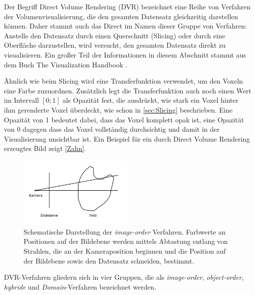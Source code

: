 \documentclass[a4paper,fontsize=12pt,toc=bib,parskip=half,ngerman]{scrartcl}
\begin{document}
Der Begriff \glq Direct Volume Rendering\grq{} (DVR) bezeichnet eine Reihe von Verfahren der Volumenvisualisierung, die den gesamten Datensatz gleichzeitig darstellen k\"onnen. Daher stammt auch das \glq Direct\grq{} im Namen dieser Gruppe von Verfahren: Anstelle den Datensatz durch einen Querschnitt (Slicing) oder durch eine Oberfl\"ache darzustellen, wird versucht, den gesamten Datensatz direkt zu visualisieren. Ein gro{\ss}er Teil der Informationen in diesem Abschnitt stammt aus dem Buch \glqq The Visualization Handbook\grqq{} \cite{hansen2005visualization}.

\"Ahnlich wie beim Slicing wird eine Transferfunktion verwendet, um den Voxeln eine Farbe zuzuordnen. Zus\"atzlich legt die Transferfunktion auch noch einen Wert im Intervall $[0;1]$ als Opazit\"at fest, die ausdr\"uckt, wie stark ein Voxel hinter ihm gerenderte Voxel \"uberdeckt, wie schon in \cref{sec:Slicing} beschrieben. Eine Opazit\"at von 1 bedeutet dabei, dass das Voxel komplett opak ist, eine Opazit\"at von 0 dagegen dass das Voxel vollst\"andig durchsichtig und damit in der Visualisierung unsichtbar ist. Ein Beispiel f\"ur ein durch Direct Volume Rendering erzeugtes Bild zeigt \cref{Zahn}. 

\begin{figure}
	\centering
	\includegraphics[width=0.5\textwidth]{pictures/DVR}
	\caption{Schematische Darstellung der \textit{image-order} Verfahren. Farbwerte an Positionen auf der Bildebene werden mittels Abtastung entlang von Strahlen, die an der Kameraposition beginnen und die Position auf der Bildebene sowie den Datensatz schneiden, bestimmt.}
	\label{image-order}
\end{figure}

DVR-Verfahren gliedern sich in vier Gruppen, die als \textit{image-order}, \textit{object-order}, \textit{hybride} und \textit{Domain}-Verfahren bezeichnet werden.
\end{document}
